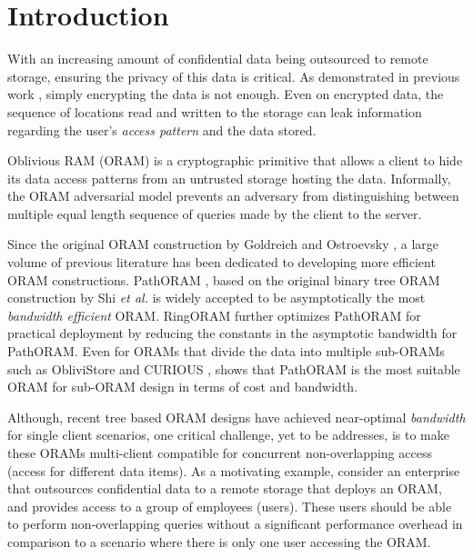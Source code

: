   \section{Introduction}
  \label{oram.intro}

  With an increasing amount of confidential data being outsourced to remote storage, 
  ensuring the privacy of this data is critical. As demonstrated in previous 
  work \cite{accesspatternleak}, 
  simply encrypting the data is not enough. Even on encrypted data, the sequence 
  of locations read and written to 
  the storage can leak information regarding the user's {\em access pattern} and 
  the data stored. 

  Oblivious RAM (ORAM) is a cryptographic primitive that allows a client to hide 
  its data access patterns from 
  an untrusted storage hosting the data. Informally, the ORAM adversarial model 
  prevents an adversary from distinguishing 
  between multiple equal length sequence of queries made by the client to the 
  server.

  Since the original ORAM construction by Goldreich and Ostroevsky 
  \cite{goldreich}, a large volume 
  of previous literature 
  \cite{oram_cuckoohashing,bforam,privatefs,binarytreeoram,pathoram,ringoram} has 
  been dedicated to developing 
  more efficient ORAM constructions. PathORAM \cite{pathoram}, based on the 
  original binary tree ORAM construction by 
  Shi {\em et al.} \cite{binarytreeoram} is widely accepted to be asymptotically 
  the most {\em bandwidth efficient} ORAM. RingORAM \cite{ringoram} 
  further optimizes PathORAM \cite{pathoram} for practical deployment by reducing the constants in the
  asymptotic bandwidth for PathORAM. Even for ORAMs that divide the data into 
  multiple sub-ORAMs such as ObliviStore \cite{oblivistore} and CURIOUS 
  \cite{curious}, \cite{curious} shows that PathORAM \cite{pathoram} is the most 
  suitable ORAM for sub-ORAM design in terms of cost and bandwidth.

  Although, recent tree based ORAM designs have achieved near-optimal {\em bandwidth} 
  for single client scenarios, 
  one critical challenge, yet to be addresses, is to make
  these ORAMs multi-client compatible for concurrent non-overlapping access (access for different data items).
  As a motivating example, consider an enterprise that outsources confidential 
  data to a remote storage that deploys an ORAM, and provides access
  to a group of employees (users). 
  These users should be able to perform non-overlapping queries 
  without a significant performance overhead in comparison to a scenario where there is 
  only one user accessing the ORAM.

